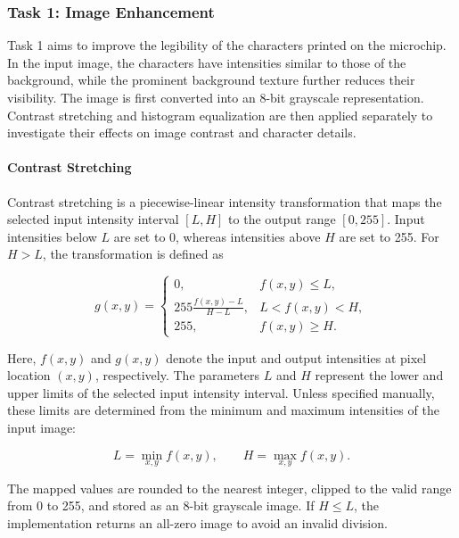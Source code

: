 \documentclass[conference]{IEEEtran}
\begin{document}
\subsubsection{Task 1: Image Enhancement}

Task 1 aims to improve the legibility of the characters printed on the
microchip. In the input image, the characters have intensities similar to
those of the background, while the prominent background texture further
reduces their visibility. The image is first converted into an 8-bit
grayscale representation. Contrast stretching and histogram equalization
are then applied separately to investigate their effects on image contrast
and character details.

\paragraph{Contrast Stretching}

Contrast stretching is a piecewise-linear intensity transformation that
maps the selected input intensity interval $[L,H]$ to the output range
$[0,255]$. Input intensities below $L$ are set to 0, whereas intensities
above $H$ are set to 255. For $H>L$, the transformation is defined as

\begin{equation}
g(x,y)=
\begin{cases}
0, & f(x,y)\leq L,\\[3pt]
\displaystyle 255\frac{f(x,y)-L}{H-L},
& L<f(x,y)<H,\\[6pt]
255, & f(x,y)\geq H.
\end{cases}
\label{eq:stretch}
\end{equation}

Here, $f(x,y)$ and $g(x,y)$ denote the input and output intensities at
pixel location $(x,y)$, respectively. The parameters $L$ and $H$ represent
the lower and upper limits of the selected input intensity interval.
Unless specified manually, these limits are determined from the minimum
and maximum intensities of the input image:

\begin{equation}
L=\min_{x,y}f(x,y),
\qquad
H=\max_{x,y}f(x,y).
\label{eq:stretch_limits}
\end{equation}

The mapped values are rounded to the nearest integer, clipped to the valid
range from 0 to 255, and stored as an 8-bit grayscale image. If $H\leq L$,
the implementation returns an all-zero image to avoid an invalid division.
\end{document}

